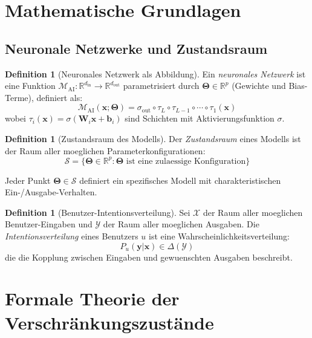 \documentclass[12pt, a4paper]{article}
\theoremstyle{definition}
\newtheorem{definition}[theorem]{Definition}
\theoremstyle{remark}
\newcommand{\R}{\mathbb{R}}
\newcommand{\vx}{\bm{x}}
\newcommand{\vy}{\bm{y}}
\newcommand{\vW}{\bm{W}}
\newcommand{\vTheta}{\bm{\Theta}}
\newcommand{\Model}{\mathcal{M}_{\mathrm{AI}}}
\begin{document}
\section{Mathematische Grundlagen}
\label{sec:grundlagen}

\subsection{Neuronale Netzwerke und Zustandsraum}
\label{subsec:neural_state}

\begin{definition}[Neuronales Netzwerk als Abbildung]
\label{def:neural_net}
Ein \emph{neuronales Netzwerk} ist eine Funktion $\Model: \R^{d_{\mathrm{in}}} \to \R^{d_{\mathrm{out}}}$ parametrisiert durch $\vTheta \in \R^p$ (Gewichte und Bias-Terme), definiert als:
\[
  \Model(\vx; \vTheta) = \sigma_{\mathrm{out}} \circ \tau_L \circ \tau_{L-1} \circ \cdots \circ \tau_1(\vx)
\]
wobei $\tau_i(\vx) = \sigma(\vW_i \vx + \mathbf{b}_i)$ sind Schichten mit Aktivierungsfunktion $\sigma$.
\end{definition}

\begin{definition}[Zustandsraum des Modells]
\label{def:state_space}
Der \emph{Zustandsraum} eines Modells ist der Raum aller moeglichen Parameterkonfigurationen:
\[
  \mathcal{S} = \{\vTheta \in \R^p : \vTheta \text{ ist eine zulaessige Konfiguration}\}
\]

Jeder Punkt $\vTheta \in \mathcal{S}$ definiert ein spezifisches Modell mit charakteristischen Ein-/Ausgabe-Verhalten.
\end{definition}

\begin{definition}[Benutzer-Intentionsverteilung]
\label{def:user_intent}
Sei $\mathcal{X}$ der Raum aller moeglichen Benutzer-Eingaben und $\mathcal{Y}$ der Raum aller moeglichen Ausgaben. Die \emph{Intentionsverteilung} eines Benutzers $u$ ist eine Wahrscheinlichkeitsverteilung:
\[
  P_u(\vy | \vx) \in \Delta(\mathcal{Y})
\]
die die Kopplung zwischen Eingaben und gewuenschten Ausgaben beschreibt.
\end{definition}

\section{Formale Theorie der Verschränkungszustände}
\label{sec:verschränkung}
\end{document}
